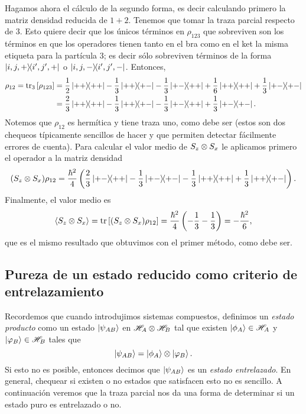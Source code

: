 \documentclass[10pt, a4paper]{article}
\numberwithin{equation}{subsection}
\begin{document}
Hagamos ahora el cálculo de la segundo forma, es decir calculando primero la
matriz densidad reducida de $1+2$. Tenemos que tomar la traza parcial respecto
de 3. Esto quiere decir que los únicos términos en $\rho_{123}$ que sobreviven
son los términos en que los operadores tienen tanto en el bra como en el ket la
misma etiqueta para la partícula 3; es decir sólo sobreviven términos de la
forma $\ketbra{i,j,+}{i',j',+}$ o $\ketbra{i,j,-}{i',j',-}$. Entonces,
\begin{align}
  \rho_{12} = \tr_3\left[\rho_{123}\right]
  &= \frac{1}{2}\ketbra{++}{++} - \frac{1}{3}\ketbra{++}{+-} -
    \frac{1}{3}\ketbra{+-}{++} + \frac{1}{6}\ketbra{++}{++} +
    \frac{1}{3}\ketbra{+-}{+-} \nonumber \\
  &= \frac{2}{3}\ketbra{++}{++} - \frac{1}{3}\ketbra{++}{+-} -
    \frac{1}{3}\ketbra{+-}{++} + \frac{1}{3}\ketbra{+-}{+-}.
\end{align}
Notemos que $\rho_{12}$ es hermítica y tiene traza uno, como debe ser (estos
son dos chequeos típicamente sencillos de hacer y que permiten detectar
fácilmente errores de cuenta). Para calcular el valor medio de $S_z \otimes
S_x$ le aplicamos primero el operador a la matriz densidad
\begin{equation}
  (S_z \otimes S_x)\rho_{12} 
  = \frac{\hbar^2}{4} \left(
    \frac{2}{3}\ketbra{+-}{++} - \frac{1}{3}\ketbra{+-}{+-} -
    \frac{1}{3}\ketbra{++}{++} + \frac{1}{3}\ketbra{++}{+-} \right).
\end{equation}
Finalmente, el valor medio es
\begin{equation}
  \expval{S_z \otimes S_x} = \tr\left[(S_z \otimes S_x)\rho_{12}\right]
  = \frac{\hbar^2}{4}\left( -\frac{1}{3} - \frac{1}{3}\right)
  = -\frac{\hbar^2}{6},
\end{equation}
que es el mismo resultado que obtuvimos con el primer método, como debe ser.

\bigbreak


\subsection{Pureza de un estado reducido como criterio de entrelazamiento}
Recordemos que cuando introdujimos sistemas compuestos, definimos un
\emph{estado producto} como un estado $\ket{\psi_{AB}}$ en
$\mathscr{H}_A\otimes\mathscr{H}_B$ tal que existen $\ket{\phi_{A}} \in \mathscr{H}_A$ y
$\ket{\varphi_{B}} \in \mathscr{H}_B$  tales que
\begin{equation}
  \ket{\psi_{AB}} = \ket{\phi_{A}}\otimes\ket{\varphi_{B}}.
\end{equation}
Si esto no es posible, entonces decimos que $\ket{\psi_{AB}}$ es un
\emph{estado entrelazado}. En general, chequear si existen o no estados que
satisfacen esto no es sencillo. A continuación veremos que la traza parcial nos
da una forma de determinar si un estado puro es entrelazado o no.
\end{document}
